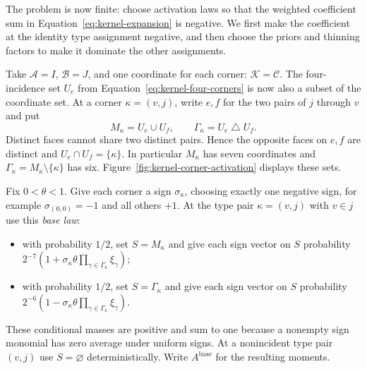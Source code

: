 The problem is now finite: choose activation laws so that the weighted
coefficient sum in Equation~\eqref{eq:kernel-expansion} is negative.
We first make the coefficient at the identity type assignment negative,
and then choose the priors and thinning factors to make it dominate
the other assignments.

Take $\mathcal A=I$, $\mathcal B=J$, and one coordinate for each
corner: $\mathcal K=\mathscr C$. The four-incidence set \(U_e\) from
Equation~\eqref{eq:kernel-four-corners} is now also a subset of the
coordinate set.
At a corner $\kappa=(v,j)$, write $e,f$ for the two pairs of $j$
through $v$ and put
\begin{equation}
 M_\kappa=U_e\cup U_f,
 \qquad \Gamma_\kappa=U_e\mathbin\triangle U_f.
 \label{eq:kernel-seven-six}
\end{equation}
Distinct faces cannot share two distinct pairs. Hence the opposite
faces on $e,f$ are distinct and
$U_e\cap U_f=\{\kappa\}$. In particular $M_\kappa$ has seven
coordinates and $\Gamma_\kappa=M_\kappa\setminus\{\kappa\}$ has six.
Figure~\ref{fig:kernel-corner-activation} displays these sets.



Fix $0<\theta<1$. Give each corner a sign $\sigma_\kappa$, choosing
exactly one negative sign, for example $\sigma_{(0,0)}=-1$ and all
others $+1$. At the type pair $\kappa=(v,j)$ with $v\in j$ use this
\emph{base law}:
\begin{itemize}
\item with probability $1/2$, set $S=M_\kappa$ and give each sign
vector on $S$ probability
$2^{-7}(1+\sigma_\kappa\theta\prod_{\gamma\in\Gamma_\kappa}\xi_\gamma)$;
\item with probability $1/2$, set $S=\Gamma_\kappa$ and give each
sign vector on $S$ probability
$2^{-6}(1-\sigma_\kappa\theta\prod_{\gamma\in\Gamma_\kappa}\xi_\gamma)$.
\end{itemize}
These conditional masses are positive and sum to one because a
nonempty sign monomial has zero average under uniform signs. At a
nonincident type pair $(v,j)$ use $S=\varnothing$ deterministically.
Write $A^{\mathrm{base}}$ for the resulting moments.

